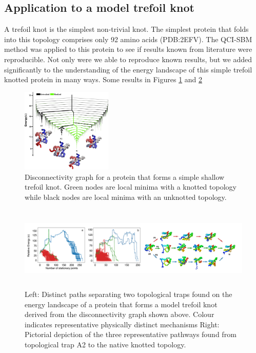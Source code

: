 \documentclass[a4paper,11pt]{article}
\begin{document}
\subsection{Application to a model trefoil knot}
A trefoil knot is the simplest non-trivial knot. The simplest protein that folds into this topology comprises only 92 amino acids (PDB:2EFV). The QCI-SBM  method was applied to this protein to see if results known from literature were reproducible. Not only were we able to reproduce known results, but we added significantly to the understanding of the energy landscape of this simple trefoil knotted protein in many ways. Some results in Figures \ref{fig:2efv_1} and \ref{fig:2efv_2}
\begin{figure}[htbp]
    \centering
    \includegraphics[height=4cm]{2efv_mukund.png}
    \caption{Disconnectivity graph for a protein that forms a simple shallow trefoil knot. Green nodes are local minima with a knotted topology while black nodes are local minima with an unknotted topology.}
    \label{fig:2efv_1}
\end{figure}
\begin{figure}[htbp]
    \centering
    \includegraphics[height=4cm]{2efv_mukund2.png}
    \caption{Left: Distinct paths separating two topological traps found on the energy landscape of a protein that forms a model trefoil knot derived from the disconnectivity graph  shown above. Colour indicates representative physically distinct mechanisms Right: Pictorial depiction of the three representative pathways  found from topological trap A2 to the native knotted topology. }
    \label{fig:2efv_2}
\end{figure}
\end{document}

